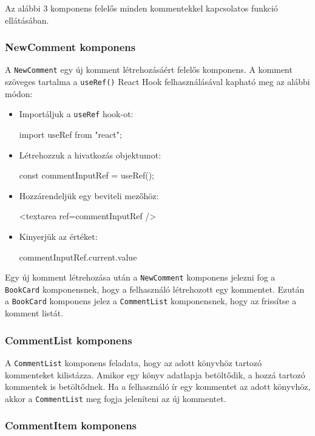 Az alábbi 3 komponens felelős minden kommentekkel kapcsolatos funkció ellátásában.

\subsubsection{NewComment komponens}

A \texttt{NewComment} egy új komment létrehozásáért felelős komponens. A komment szöveges tartalma a \texttt{useRef()} React Hook felhasználásával kapható meg az alábbi módon:
\begin{itemize}
\item Importáljuk a \texttt{useRef} hook-ot:
\begin{java}
import { useRef } from "react";
\end{java}
\item Létrehozzuk a hivatkozás objektumot:
\begin{java}
const commentInputRef = useRef();
\end{java}
\item Hozzárendeljük egy beviteli mezőhöz:
\begin{java}
<textarea ref={commentInputRef} />
\end{java}
\item Kinyerjük az értéket:
\begin{java}
commentInputRef.current.value
\end{java}
\end{itemize}

Egy új komment létrehozása után a \texttt{NewComment} komponens jelezni fog a \texttt{BookCard} komponensnek, hogy a felhasználó létrehozott egy kommentet. Ezután a \texttt{BookCard} komponens jelez a \texttt{CommentList} komponensnek, hogy az frissítse a komment listát.


\subsubsection{CommentList komponens}

A \texttt{CommentList} komponens feladata, hogy az adott könyvhöz tartozó kommenteket kilistázza. Amikor egy könyv adatlapja betöltődik, a hozzá tartozó kommentek is betöltődnek. Ha a felhasználó ír egy kommentet az adott könyvhöz, akkor a \texttt{CommentList} meg fogja jeleníteni az új kommentet.

\subsubsection{CommentItem komponens}


